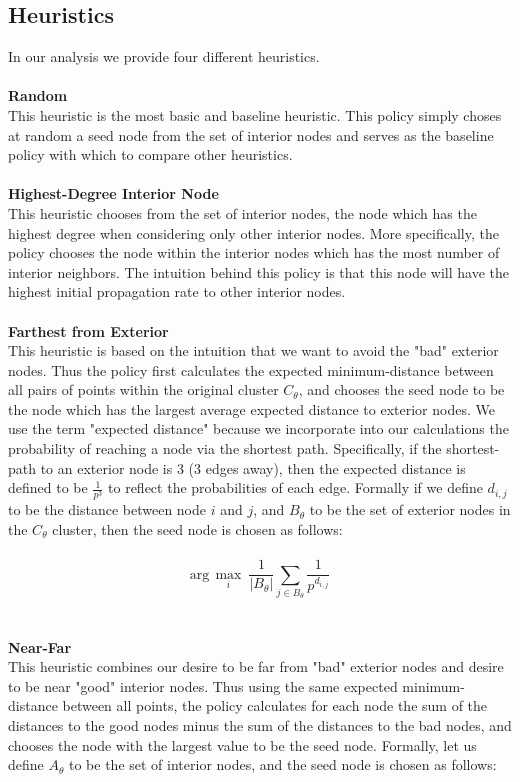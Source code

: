 \documentclass{article}
\begin{document}
\subsection{Heuristics}
In our analysis we provide four different heuristics.
\\ \\
\textbf{Random} \\
This heuristic is the most basic and baseline heuristic. This policy simply choses at random a seed node from the set of interior nodes and serves as the baseline policy with which to compare other heuristics.
\\ \\
\textbf{Highest-Degree Interior Node} \\
This heuristic chooses from the set of interior nodes, the node which has the highest degree when considering only other interior nodes. More specifically, the policy chooses the node within the interior nodes which has the most number of interior neighbors. The intuition behind this policy is that this node will have the highest initial propagation rate to other interior nodes.
\\ \\
\textbf{Farthest from Exterior} \\
This heuristic is based on the intuition that we want to avoid the "bad" exterior nodes. Thus the policy first calculates the expected minimum-distance between all pairs of points within the original cluster $C_{\theta}$, and chooses the seed node to be the node which has the largest average expected distance to exterior nodes. We use the term "expected distance" because we incorporate into our calculations the probability of reaching a node via the shortest path. Specifically, if the shortest-path to an exterior node is 3 (3 edges away), then the expected distance is defined to be $\frac{1}{p^3}$ to reflect the probabilities of each edge. Formally if we define $d_{i,j}$ to be the distance between node $i$ and $j$, and $B_{\theta}$ to be the set of exterior nodes in the $C_{\theta}$ cluster, then the seed node is chosen as follows:
\\ \\
\begin{equation}
\text{arg}\,\max\limits_{i}\  \frac{1}{|B_{\theta}|} \sum_{j \in B_{\theta}} \frac{1}{p^{d_{i,j}}}
\end{equation}
\\ \\
\textbf{Near-Far} \\
This heuristic combines our desire to be far from "bad" exterior nodes and desire to be near "good" interior nodes. Thus using the same expected minimum-distance between all points, the policy calculates for each node the sum of the distances to the good nodes minus the sum of the distances to the bad nodes, and chooses the node with the largest value to be the seed node. Formally, let us define $A_{\theta}$ to be the set of interior nodes, and the seed node is chosen as follows:
\end{document}
